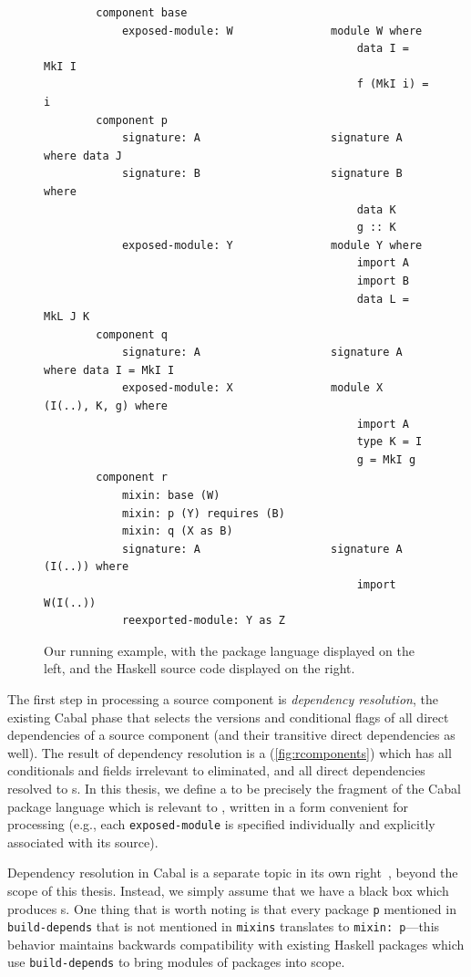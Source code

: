 \begin{figure}
\begin{verbatim}
        component base
            exposed-module: W               module W where
                                                data I = MkI I
                                                f (MkI i) = i
        component p
            signature: A                    signature A where data J
            signature: B                    signature B where
                                                data K
                                                g :: K
            exposed-module: Y               module Y where
                                                import A
                                                import B
                                                data L = MkL J K
        component q
            signature: A                    signature A where data I = MkI I
            exposed-module: X               module X (I(..), K, g) where
                                                import A
                                                type K = I
                                                g = MkI g
        component r
            mixin: base (W)
            mixin: p (Y) requires (B)
            mixin: q (X as B)
            signature: A                    signature A (I(..)) where
                                                import W(I(..))
            reexported-module: Y as Z
\end{verbatim}
  \caption{Our running example, with the package language displayed
  on the left, and the Haskell source code displayed on the right.}\label{fig:resolved-example}
\end{figure}

The first step in
processing a source component is \emph{dependency resolution},
the existing Cabal phase that
selects the versions and conditional flags of all direct dependencies of
a source component (and their transitive direct dependencies as well).
The result of dependency resolution is a \emph{\ccomp}
(\cref{fig:rcomponents}) which has all conditionals and fields
irrelevant to \Backpack{} eliminated, and all direct dependencies
resolved to \cid{}s.  In this thesis, we define a \ccomp{} to be precisely the fragment of the
Cabal package language which is relevant to \Backpack{}, written in a
form convenient for processing (e.g., each \verb|exposed-module| is
specified individually and explicitly associated with its source).

Dependency resolution in Cabal is a separate topic in its own
right~\cite{well-typed-solver, well-typed-qualified}, beyond the scope of this thesis.
Instead, we simply assume that we have a black box which
produces \ccomp{}s.  One thing that is worth noting is that
every package \verb|p| mentioned in \verb|build-depends|
that is not mentioned in \verb|mixins| translates to
\verb|mixin: p|---this behavior maintains backwards compatibility
with existing Haskell packages which use \verb|build-depends| to
bring modules of packages into scope.


